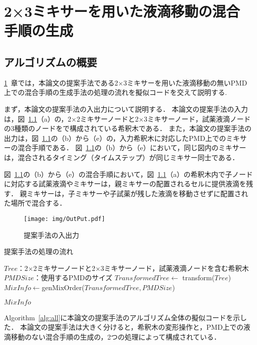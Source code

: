 \chapter{{2×3ミキサーを用いた液滴移動の混合手順の生成}}
\label{proposed}
\section{アルゴリズムの概要}
\ref{proposed}~章では，本論文の提案手法である2$\times$3ミキサーを用いた液滴移動の無いPMD上での混合手順の生成手法の処理の流れを擬似コードを交えて説明する.


まず，本論文の提案手法の入出力について説明する．
本論文の提案手法の入力は，図~\ref{fig:inputoutput}（a）の，2$\times$2ミキサーノードと2$\times$3ミキサーノード，試薬液滴ノードの3種類のノードをで構成されている希釈木である．
また，本論文の提案手法の出力は，図~\ref{fig:inputoutput}の（b）から（e）の，入力希釈木に対応したPMD上でのミキサーの混合手順である．
図~\ref{fig:inputoutput}の（b）から（e）において，同じ図内のミキサーは，混合されるタイミング（タイムステップ）が同じミキサー同士である．

図~\ref{fig:inputoutput}の（b）から（e）の混合手順において，図~\ref{fig:inputoutput}（a）の希釈木内で子ノードに対応する試薬液滴やミキサーは，親ミキサーの配置されるセルに提供液滴を残す．
親ミキサーは，子ミキサーや子試薬が残した液滴を移動させずに配置された場所で混合する．

\begin{figure}[tbp]
 \centering\texttt{[image: img/OutPut.pdf]}
 \caption{提案手法の入出力}\label{fig:inputoutput}
\end{figure}

\begin{algorithm}[tbp]
 \caption{提案手法の処理の流れ}\label{alg:all}
 \begin{algorithmic}[1]
     \Require $\mathit{Tree}$：2$\times$2ミキサーノードと2$\times$3ミキサーノード，試薬液滴ノードを含む希釈木 
     \Require $\mathit{PMDSize}$：使用するPMDのサイズ
     \State $\mathit{TransformedTree} \gets$ transform($Tree$) \label{transform_pseudo}
     \State $\mathit{MixInfo \gets}$genMixOrder($\mathit{TransformedTree,PMDSize}$)  \label{xntm_pseudo}

      \Return $\mathit{MixInfo}$
 \end{algorithmic}
\end{algorithm}
Algorithm~\ref{alg:all}に本論文の提案手法のアルゴリズム全体の擬似コードを示した．
本論文の提案手法は大きく分けると，希釈木の変形操作と，PMD上での液滴移動のない混合手順の生成の，2つの処理によって構成されている．

